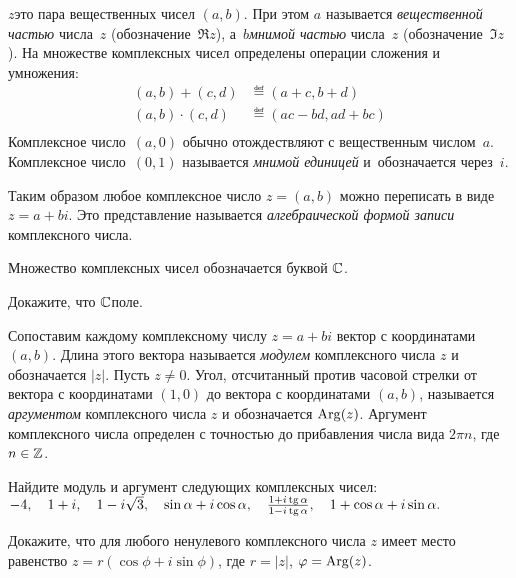 \documentclass[a4paper,12pt]{article}
\begin{document}




 $z$\т это пара вещественных чисел $(a, b)$. При этом $a$ называется \emph{вещественной частью} числа~$z$ (обозначение~$\Re z$), а~$b$\т \emph{мнимой частью} числа~$z$ (обозначение~$\Im z$).
На множестве комплексных чисел определены операции сложения и умножения:
\[
\begin{aligned}
(a, b) + (c, d) &\eqdef (a+c, b+d)\\
(a, b) \cdot (c, d) &\eqdef (ac - bd, ad + bc)\\
\end{aligned}
\]
Комплексное число~$(a, 0)$ обычно отождествляют с вещественным числом~$a$. Комплексное число~$(0, 1)$ называется \emph{мнимой единицей} и~обозначается через~$i$.

Таким образом любое комплексное число $z = (a, b)$ можно переписать в виде $z = a+bi$. Это представление называется \emph{алгебраической формой записи} комплексного числа.

Множество комплексных чисел обозначается буквой $\mathbb{C}$.


Докажите, что $\mathbb{C}$\т поле.

Сопоставим каждому комплексному числу $z=a+bi$ вектор с координатами $(a, b)$. Длина этого вектора называется \emph{модулем} комплексного числа $z$ и обозначается $|z|$.
Пусть $z \ne 0$. Угол, отсчитанный против часовой стрелки от вектора с координатами $(1, 0)$ до вектора с координатами $(a, b)$, называется \emph{аргументом} комплексного числа $z$ и обозначается $\operatorname{Arg}(z)$. Аргумент комплексного числа определен с точностью до прибавления числа вида $2\pi n$, где $n\in\mathbb{Z}$.

Найдите модуль и аргумент следующих комплексных чисел:\\
$
-4,\quad
1+i,\quad
1-i\sqrt{3},\quad
\sin\alpha + i\cos\alpha,\quad
\frac{1+i\tg\alpha}{1-i\tg\alpha},\quad
1+\cos\alpha+i\sin\alpha.
$

Докажите, что для любого ненулевого комплексного числа $z$ имеет место равенство $z=r(\cos\phi + i\sin\phi)$, где $r=|z|$, $\varphi=\operatorname{Arg}(z)$.
\end{document}
